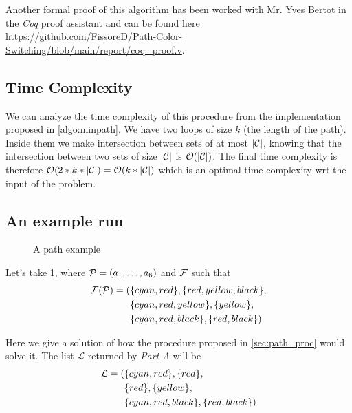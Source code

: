 Another formal proof of this algorithm has been worked with Mr. Yves Bertot in the \textit{Coq} proof assistant and can be found here \url{https://github.com/FissoreD/Path-Color-Switching/blob/main/report/coq_proof.v}.

\subsection{Time Complexity}

We can analyze the time complexity of this procedure from the implementation proposed in \cref{algo:minpath}. We have two loops of size $k$ (the length of the path). Inside them we make intersection between sets of at most $| \mathcal{C} |$, knowing that the intersection between two sets of size $| \mathcal{C} |$ is $\mathcal{O}(| \mathcal{C} |)$. The final time complexity is therefore $\mathcal{O}(2 * k * | \mathcal{C} |) = \mathcal{O}(k * | \mathcal{C} |)$ which is an optimal time complexity wrt the input of the problem.

\subsection{An example run}
\label{sec:path_ex_run}

\begin{figure}[!htb]

	\centering
	\caption{A path example}
	\label{fig:path_example}

\end{figure}

Let's take \cref{fig:path_example}, where $\mathcal{P} = (a_1,\ldots,a_{6})$ and $\mathcal{F}$ such that
\begin{align*}
	\mathcal{F}(\mathcal{P}) = ( & \{cyan,red\}, \{red,yellow,black\},    \\
	                 & \{cyan,red,yellow\}, \{yellow\},    \\
	                 & \{cyan,red,black\}, \{red,black\}   )
\end{align*}

Here we give a solution of how the procedure proposed in \cref{sec:path_proc} would solve it. The list $\mathcal{L}$ returned by \textit{Part A} will be
\begin{align*}
	\mathcal{L} = ( & \{cyan,red\}, \{red\},      \\
	                & \{red\}, \{yellow\},        \\
	                & \{cyan,red,black\}, \{red,black\}   )
\end{align*}

